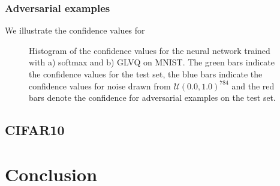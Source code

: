 \documentclass{esannV2}
\begin{document}
\subsubsection{Adversarial examples}
We illustrate the confidence values for 

\begin{figure}[ht]
\caption{Histogram of the confidence values for the neural network trained with a) softmax and b) GLVQ on MNIST. The green bars indicate the confidence values for the test set, the blue bars indicate the confidence values for noise drawn from $\mathcal{U}(0.0, 1.0)^{784}$ and the red bars denote the confidence for adversarial examples on the test set.}
\end{figure}

\subsection{CIFAR10}


\section{Conclusion}

\begin{footnotesize}





\end{footnotesize}
\end{document}
